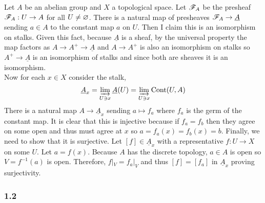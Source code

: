 \documentclass[12pt]{article}
\begin{document}
Let $A$ be an abelian group and $X$ a topological space. Let $\mathscr{F}_A$ be the presheaf $\mathscr{F}_A : U \to A$ for all $U \neq \varnothing$. There is a natural map of presheaves $\mathscr{F}_A \to \underline{A}$ sending $a \in A$ to the constant map $a$ on $U$. Then I claim this is an isomorphism on stalks. Given this fact, because $\underline{A}$ is a sheaf, by the universal property the map factors as $A \to A^+ \to \underline{A}$ and $A \to A^+$ is also an isomorphism on stalks so $A^+ \to \underline{A}$ is an isomorphism of stalks and since both are sheaves it is an isomorphism. 
\bigskip\\
Now for each $x \in X$ consider the stalk,
\[ \underline{A}_x = \varinjlim_{U \ni x} \underline{A}(U) = \varinjlim_{U \ni x} \mathrm{Cont}(U, A) \]
There is a natural map $A \to \underline{A}_x$ sending $a \mapsto f_a$ where $f_a$ is the germ of the constant map. It is clear that this is injective because if $f_a = f_b$ then they agree on some open and thus must agree at $x$ so $a = f_a(x) = f_b(x) = b$. Finally, we need to show that it is surjective. Let $[f] \in \underline{A}_x$ with a representative $f : U \to X$ on some $U$. Let $a = f(x)$. Because $A$ has the discrete topology, $a \in A$ is open so $V = f^{-1}(a)$ is open. Therefore, $f|_V = f_a|_V$ and thus $[f] = [f_a]$ in $\underline{A}_x$ proving surjectivity.

\subsubsection{1.2}
\end{document}
